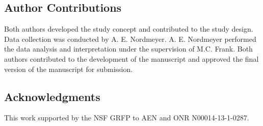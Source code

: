 \documentclass[man, noapacite]{apa2}
\begin{document}
\subsection{Author Contributions}
Both authors developed the study concept and contributed to the study design.  Data collection was conducted by A. E. Nordmeyer.  A. E. Nordmeyer performed the data analysis and interpretation under the supervision of M.C. Frank.  Both authors contributed to the development of the manuscript and approved the final version of the manuscript for submission.

\subsection{Acknowledgments}
This work supported by the NSF GRFP to AEN and ONR N00014-13-1-0287.





\end{document}
